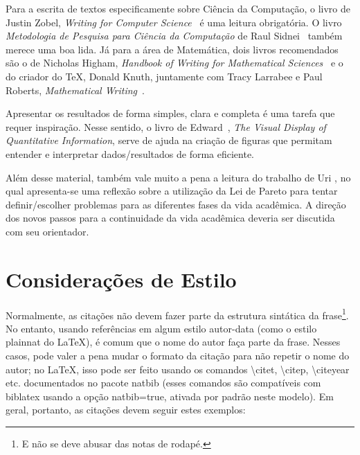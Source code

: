 Para a escrita de textos especificamente sobre Ciência da Computação, o
livro de Justin Zobel, \emph{Writing for Computer Science}~\citep{zobel:04}
é uma leitura obrigatória. O livro \emph{Metodologia de Pesquisa para
Ciência da Computação} de
Raul Sidnei~\citet{waz:09} %
também merece uma boa lida. Já para a área de Matemática, dois livros
recomendados são o de Nicholas Higham, \emph{Handbook of Writing for
Mathematical Sciences}~\citep{Higham:98} e o do criador do \TeX{}, Donald
Knuth, juntamente com Tracy Larrabee e Paul Roberts, \emph{Mathematical
Writing}~\citep{Knuth:96}.

Apresentar os resultados de forma simples, clara e completa é uma tarefa que
requer inspiração. Nesse sentido, o livro de
Edward~\citet{tufte01:visualDisplay}, %
\emph{The Visual Display of Quantitative Information}, serve de ajuda na
criação de figuras que permitam entender e interpretar dados/resultados de forma
eficiente.

Além desse material, também vale muito a pena a leitura do trabalho de
Uri \citet{alon09:how}, %
no qual apresenta-se uma reflexão sobre a utilização da Lei de Pareto para
tentar definir/escolher problemas para as diferentes fases da vida acadêmica.
A direção dos novos passos para a continuidade da vida acadêmica deveria ser
discutida com seu orientador.

\section{Considerações de Estilo}
\label{sec:consideracoes_preliminares}

Normalmente, as citações não devem fazer parte da estrutura sintática da
frase\footnote{E não se deve abusar das notas de rodapé.}.
No entanto, usando referências em algum estilo autor-data (como o estilo
plainnat do \LaTeX{}), é comum que o nome do autor faça parte da frase. Nesses
casos, pode valer a pena mudar o formato da citação para não repetir o nome do
autor; no \LaTeX{}, isso pode ser feito usando os comandos
\textsf{\textbackslash{}citet}, \textsf{\textbackslash{}citep},
\textsf{\textbackslash{}citeyear} etc. documentados no pacote
natbib \citep{natbib} (esses comandos são compatíveis com biblatex
usando a opção \textsf{natbib=true}, ativada por padrão neste modelo). Em geral,
portanto, as citações devem seguir estes exemplos:

